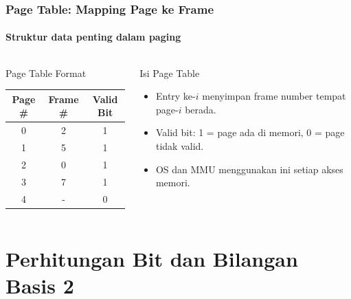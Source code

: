 \documentclass[t,aspectratio=169,xcolor=dvipsnames]{beamer}
\begin{document}
\begin{frame}
    \frametitle{Page Table: Mapping Page ke Frame}
    \framesubtitle{Struktur data penting dalam paging}
    \small
    \begin{columns}[T]
        \begin{block}{Page Table Format}
            \begin{tabular}{|c|c|c|}
                \hline
                \textbf{Page \#} & \textbf{Frame \#} & \textbf{Valid Bit} \\
                \hline
                0 & 2 & 1 \\
                \hline
                1 & 5 & 1 \\
                \hline
                2 & 0 & 1 \\
                \hline
                3 & 7 & 1 \\
                \hline
                4 & - & 0 \\
                \hline
            \end{tabular}
        \end{block}

        \begin{alertblock}{Isi Page Table}
            \begin{itemize}
                \item Entry ke-$i$ menyimpan frame number tempat page-$i$ berada.
                \item Valid bit: 1 = page ada di memori, 0 = page tidak valid.
                \item OS dan MMU menggunakan ini setiap akses memori.
            \end{itemize}
        \end{alertblock}
    \end{columns}
\end{frame}

\section{Perhitungan Bit dan Bilangan Basis 2}
\end{document}
